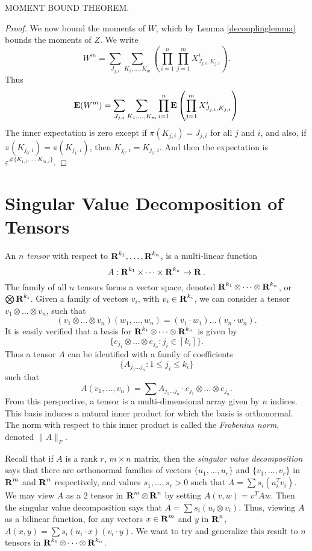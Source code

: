 \begin{lemma}
	MOMENT BOUND THEOREM.
\end{lemma}
\begin{proof}
	We now bound the moments of $W$, which by Lemma \ref{decouplinglemma} bounds the moments of $Z$. We write
	\[ W^m = \sum_{J_{j,i}} \sum_{K_1, \dots, K_m} \left( \prod_{i = 1}^n \prod_{j = 1}^m X_{J_{j,i}, K_{j,i}}^i \right). \]
	Thus
	\[ \operatorname{\mathbf{E}}(W^m) = \sum_{J_{j,i}} \sum_{K_1, \dots, K_m} \prod_{i = 1}^n \operatorname{\mathbf{E}} \left( \prod_{j = 1}^m X_{J_{j,i}, K_{j,i}}^i \right) \]
	The inner expectation is zero except if $\pi(K_{j,i}) = J_{j,i}$ for all $j$ and $i$, and also, if $\pi(K_{j_0,i}) = \pi(K_{j_1,i})$, then $K_{j_0,i} = K_{j_1,i}$. And then the expectation is $\varepsilon^{\# \{ K_{1,i}, \dots, K_{m,i} \}}$.
\end{proof}

\section{Singular Value Decomposition of Tensors}

An \emph{$n$ tensor} with respect to $\operatorname{\mathbf{R}}^{k_1}, \dots, \operatorname{\mathbf{R}}^{k_n}$, is a multi-linear function
%
\[ A: \operatorname{\mathbf{R}}^{k_1} \times \dots \times \operatorname{\mathbf{R}}^{k_n} \to \operatorname{\mathbf{R}}. \]
%
The family of all $n$ tensors forms a vector space, denoted $\operatorname{\mathbf{R}}^{k_1} \otimes \dots \otimes \operatorname{\mathbf{R}}^{k_n}$, or $\bigotimes \operatorname{\mathbf{R}}^{k_i}$. Given a family of vectors $v_i$, with $v_i \in \operatorname{\mathbf{R}}^{k_i}$, we can consider a tensor $v_1 \otimes \dots \otimes v_n$, such that
%
\[ (v_1 \otimes \dots \otimes v_n)(w_1, \dots, w_n) = (v_1 \cdot w_1) \dots (v_n \cdot w_n). \]
%
It is easily verified that a basis for $\operatorname{\mathbf{R}}^{k_1} \otimes \dots \otimes \operatorname{\mathbf{R}}^{k_n}$ is given by
%
\[ \{ e_{j_1} \otimes \dots \otimes e_{j_n} : j_i \in [k_i] \}. \]
%
Thus a tensor $A$ can be identified with a family of coefficients
%
\[ \{ A_{j_1 \dots j_n} : 1 \leq j_i \leq k_i \} \]
%
such that
%
\[ A(v_1,\dots,v_n) = \sum A_{j_1 \dots j_n} \cdot e_{j_1} \otimes \dots \otimes e_{j_n}. \]
%
From this perspective, a tensor is a multi-dimensional array given by $n$ indices. This basis induces a natural inner product for which the basis is orthonormal. The norm with respect to this inner product is called the \emph{Frobenius norm}, denoted $\| A \|_F$.

Recall that if $A$ is a rank $r$, $m \times n$ matrix, then the \emph{singular value decomposition} says that there are orthonormal families of vectors $\{ u_1, \dots, u_r \}$ and $\{ v_1, \dots, v_r \}$ in $\operatorname{\mathbf{R}}^m$ and $\operatorname{\mathbf{R}}^n$ respectively, and values $s_1, \dots, s_r > 0$ such that $A = \sum s_i (u_i^T v_i)$. We may view $A$ as a 2 tensor in $\operatorname{\mathbf{R}}^m \otimes \operatorname{\mathbf{R}}^n$ by setting $A(v,w) = v^T A w$. Then the singular value decomposition says that $A = \sum s_i (u_i \otimes v_i)$. Thus, viewing $A$ as a bilinear function, for any vectors $x \in \operatorname{\mathbf{R}}^m$ and $y$ in $\operatorname{\mathbf{R}}^n$, $A(x,y) = \sum s_i (u_i \cdot x) (v_i \cdot y)$. We want to try and generalize this result to $n$ tensors in $\operatorname{\mathbf{R}}^{k_1} \otimes \dots \otimes \operatorname{\mathbf{R}}^{k_n}$.

